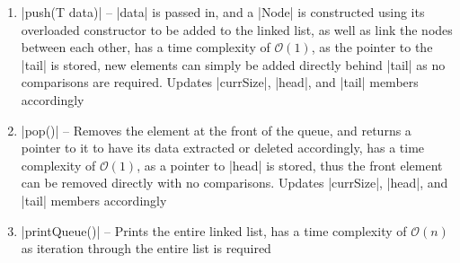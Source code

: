 \documentclass{report}
\begin{document}
\begin{itemize}
\begin{enumerate}
		\item |push(T data)| -- |data| is passed in, and a |Node| is constructed using its overloaded constructor to be added to the linked list, as well as link the nodes between each other, has a time complexity of \(\mathcal{O}(1)\), as the pointer to the |tail| is stored, new elements can simply be added directly behind |tail| as no comparisons are required. Updates |currSize|, |head|, and |tail| members accordingly
		\item |pop()| -- Removes the element at the front of the queue, and returns a pointer to it to have its data extracted or deleted accordingly, has a time complexity of \(\mathcal{O}(1)\), as a pointer to |head| is stored, thus the front element can be removed directly with no comparisons. Updates |currSize|, |head|, and |tail| members accordingly
		\item |printQueue()| -- Prints the entire linked list, has a time complexity of \(\mathcal{O}(n)\) as iteration through the entire list is required
	\end{enumerate}
\end{itemize}
\end{document}
